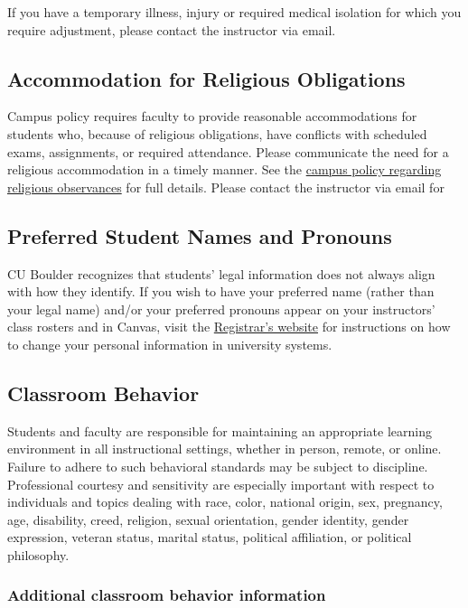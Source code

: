 If you have a temporary illness, injury or required medical isolation for which you require adjustment, please contact the instructor via email.

\subsection*{Accommodation for Religious Obligations}

Campus policy requires faculty to provide reasonable accommodations for students who, because of religious obligations, have conflicts with scheduled exams, assignments, or required attendance. Please communicate the need for a religious accommodation in a timely manner. See the \href{https://www.colorado.edu/compliance/policies/observance-religious-holidays-absences-classes-or-exams}{campus policy regarding religious observances} for full details. Please contact the instructor via email for 

\subsection*{Preferred Student Names and Pronouns}

CU Boulder recognizes that students' legal information does not always align with how they identify. If you wish to have your preferred name (rather than your legal name) and/or your preferred pronouns appear on your instructors' class rosters and in Canvas, visit the \href{https://www.colorado.edu/registrar/students/records/info/preferred}{Registrar's website} for instructions on how to change your personal information in university systems.

\subsection*{Classroom Behavior}

Students and faculty are responsible for maintaining an appropriate learning environment in all instructional settings, whether in person, remote, or online. Failure to adhere to such behavioral standards may be subject to discipline. Professional courtesy and sensitivity are especially important with respect to individuals and topics dealing with race, color, national origin, sex, pregnancy, age, disability, creed, religion, sexual orientation, gender identity, gender expression, veteran status, marital status, political affiliation, or political philosophy.

\subsubsection*{Additional classroom behavior information}

